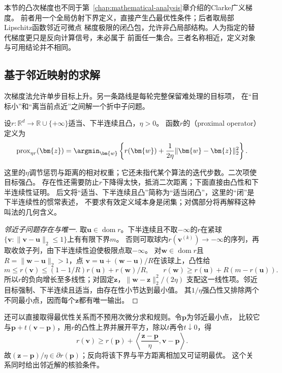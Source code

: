 本节的凸次梯度也不同于第~\ref{chap:mathematical-analysis}章介绍的Clarke广义梯度。
前者用一个全局仿射下界定义，直接产生凸最优性条件；后者取局部Lipschitz函数邻近可微点
梯度极限的闭凸包，允许非凸局部结构。人为指定的替代梯度更只是反向计算信号，未必属于
前面任一集合。三者名称相近，定义对象与可用结论并不相同。

\subsection{基于邻近映射的求解}
\label{sec:opt-nonsmooth-proximal}
\label{sec:opt-weaker-curvature}

次梯度法允许单步目标上升。另一条路线是每轮完整保留难处理的目标项，
在“目标小”和“离当前点近”之间解一个折中子问题。
\begin{definition}[凸函数的邻近算子]
\label{def:opt-proximal-operator}
设$r:\mathbb R^d\to\mathbb R\cup\{+\infty\}$适当、下半连续且凸，$\eta>0$。
函数$r$的（proximal operator）定义为
\[
  \operatorname{prox}_{\eta r}(\bm{z})
  =\argmin_{\bm{w}}
  \left\{r(\bm{w})+\frac{1}{2\eta}
  \lVert\bm{w}-\bm{z}\rVert_2^2\right\}.
\]
\end{definition}
这里的$\eta$调节惩罚与距离的相对权重；它还未指代某个算法的迭代步数。二次项使目标强凸。
存在性还需要防止$r$下降得太快，抵消二次距离；下面直接由凸性和下半连续性证明。
后文将“适当、下半连续且凸”简称为“适当闭凸”，这里的“闭”是下半连续性的惯常表述，
不要求有效定义域本身是闭集；对偶部分将再解释这种叫法的几何含义。

\begin{proof}[邻近子问题存在与唯一]
取$\bm u\in\operatorname{dom}r$。下半连续且不取$-\infty$的$r$在紧球
$\{\bm v:\|\bm v-\bm u\|_2\leq1\}$上有有限下界$m$。
否则可取球内$r(\bm v^{(k)})\to-\infty$的序列，再取收敛子列，由下半连续性迫使极限点取$-\infty$。
对$\bm w\in\operatorname{dom}r$且$R=\|\bm w-\bm u\|_2>1$，点
$\bm v=\bm u+(\bm w-\bm u)/R$在该球上，凸性给
\[
 m\leq r(\bm v)\leq(1-1/R)r(\bm u)+r(\bm w)/R,
 \qquad
 r(\bm w)\geq r(\bm u)+R(m-r(\bm u)).
\]
所以$r$的负向增长至多线性；对固定$\bm z$，$\|\bm w-\bm z\|_2^2/(2\eta)$
支配这一线性项。邻近目标强制、下半连续且适当，由存在性小节达到最小值。
其$1/\eta$强凸性又排除两个不同最小点，因而每个$\bm z$都有唯一输出。
\end{proof}

还可以直接取得最优性关系而不预用次微分求和规则。令$\bm p$为邻近最小点，
比较它与$\bm p+t(\bm v-\bm p)$，用$r$的凸性上界并展开平方，除以$t$再令$t\downarrow0$，得
\[
 r(\bm v)\geq r(\bm p)+
 \left\langle\frac{\bm z-\bm p}{\eta},\bm v-\bm p\right\rangle.
\]
故$(\bm z-\bm p)/\eta\in\partial r(\bm p)$；反向将该下界与平方距离相加又可证明最优。
这个关系同时给出邻近解的核验条件。

